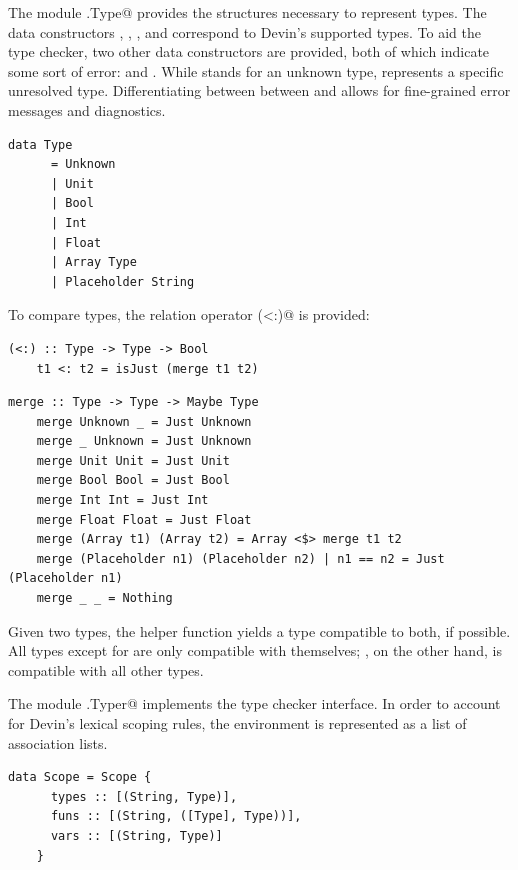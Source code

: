 \documentclass[UdineBachThesis,american,11pt,draft]{PhdThesis}
\begin{document}
  The module \lstinline@Devin.Type@ provides the structures necessary to
  represent types. The data constructors \lstinline@Unit@, \lstinline@Bool@,
  \lstinline@Int@, \lstinline@Float@ and \lstinline@Array@ correspond to Devin's
  supported types. To aid the type checker, two other data constructors are
  provided, both of which indicate some sort of error: \lstinline@Unknown@ and
  \lstinline@Placeholder@. While \lstinline@Unknown@ stands for an unknown type,
  \lstinline@Placeholder@ represents a specific unresolved type. Differentiating
  between between \lstinline@Placeholder@ and \lstinline@Unknown@ allows for
  fine-grained error messages and diagnostics.

  \begin{lstlisting}[gobble=4,basicstyle=\ttfamily\small]
    data Type
      = Unknown
      | Unit
      | Bool
      | Int
      | Float
      | Array Type
      | Placeholder String
  \end{lstlisting}

  To compare types, the relation operator \lstinline@(<:)@ is provided:

  \begin{lstlisting}[gobble=4,basicstyle=\ttfamily\small]
    (<:) :: Type -> Type -> Bool
    t1 <: t2 = isJust (merge t1 t2)
  \end{lstlisting}

  \begin{lstlisting}[gobble=4,basicstyle=\ttfamily\small]
    merge :: Type -> Type -> Maybe Type
    merge Unknown _ = Just Unknown
    merge _ Unknown = Just Unknown
    merge Unit Unit = Just Unit
    merge Bool Bool = Just Bool
    merge Int Int = Just Int
    merge Float Float = Just Float
    merge (Array t1) (Array t2) = Array <$> merge t1 t2
    merge (Placeholder n1) (Placeholder n2) | n1 == n2 = Just (Placeholder n1)
    merge _ _ = Nothing
  \end{lstlisting}

  Given two types, the helper function \lstinline@merge@ yields a type
  compatible to both, if possible. All types except for \lstinline@Unknown@ are
  only compatible with themselves; \lstinline@Unknown@, on the other hand, is
  compatible with all other types.

  The module \lstinline@Devin.Typer@ implements the type checker interface. In
  order to account for Devin's lexical scoping rules, the environment is
  represented as a list of association lists.

  \begin{lstlisting}[gobble=4,basicstyle=\ttfamily\small]
    data Scope = Scope {
      types :: [(String, Type)],
      funs :: [(String, ([Type], Type))],
      vars :: [(String, Type)]
    }
  \end{lstlisting}
\end{document}
